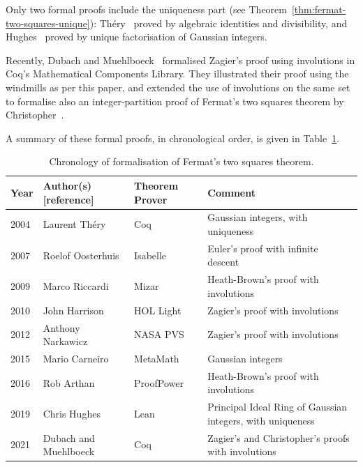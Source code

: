 \documentclass[sigplan,screen]{acmart}
\begin{document}
Only two formal proofs include the uniqueness part (see Theorem~\ref{thm:fermat-two-squares-unique}): Th{\'e}ry~\cite{Thery-2004} proved by algebraic identities and divisibility, and Hughes~\cite{Hughes-2019} proved by unique factorisation of Gaussian integers.

Recently, Dubach and Muehlboeck~\cite{Dubach-Muehlboeck-2021-acm} formalised Zagier's proof using involutions in Coq's Mathematical Components Library. They illustrated their proof using the windmills as per this paper, and extended the use of involutions on the same set to formalise also an integer-partition proof of Fermat's two squares theorem by Christopher~\cite{Christopher-2016-acm}.

A summary of these formal proofs, in chronological order, is given in Table~\ref{tbl:chronology-formalise-two-squares}.

\begin{table}[h] %
\caption{Chronology of formalisation of Fermat's two squares theorem.}
\label{tbl:chronology-formalise-two-squares}  %
\begin{tabular}{llll}
Year & Author(s)[reference] & Theorem Prover & Comment\\
\hline
2004 & Laurent Th{\'e}ry~\cite{Thery-2004} & Coq & Gaussian integers, with uniqueness\\
2007 & Roelof Oosterhuis~\cite{Oosterhuis-2007} & Isabelle & Euler's proof with infinite descent\\
2009 & Marco Riccardi~\cite{Riccardi-2009} & Mizar & Heath-Brown's proof with involutions\\
2010 & John Harrison~\cite{Harrison-2010} & HOL Light & Zagier's proof with involutions\\
2012 & Anthony Narkawicz~\cite{Narkawicz-2012-acm} & NASA PVS & Zagier's proof with involutions\\
2015 & Mario Carneiro~\cite{Carneiro-2015} & MetaMath & Gaussian integers\\
2016 & Rob Arthan~\cite{Arthan-2016} & ProofPower & Heath-Brown's proof with involutions\\
2019 & Chris Hughes~\cite{Hughes-2019} & Lean & Principal Ideal Ring of Gaussian integers, with uniqueness\\
2021 & Dubach and Muehlboeck~\cite{Dubach-Muehlboeck-2021-acm} & Coq & Zagier's and Christopher's proofs with involutions\\
\end{tabular}
\end{table}
\end{document}
